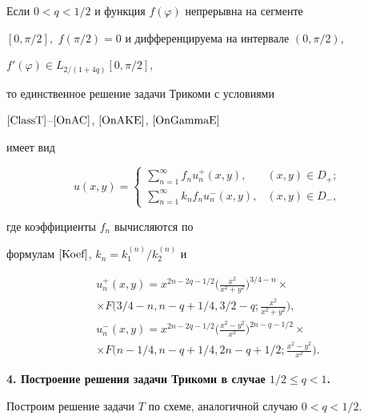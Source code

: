\begin{thm}


Если $0<q<1/2$ и функция $f(\varphi)$ непрерывна на сегменте


$[0,\pi/2],$ $f(\pi/2) = 0$ и дифференцируема на интервале $(0,\pi/2)$,


$f'(\varphi)\in L_{2/(1+4q)}[0,\pi/2]$, 


то единственное решение задачи Трикоми с условиями


$\eqref{ClassT}$--$\eqref{OnAC}$, $\eqref{OnAKE}$, $\eqref{OnGammaE}$


имеет вид


$$


u(x,y) =\begin{cases}


\sum\limits_{n=1}^\infty f_nu_n^+(x,y), & (x,y) \in D_+;\\


\sum\limits_{n=1}^\infty k_nf_nu_n^-(x,y), & (x,y) \in D_-,


\end{cases}


$$


где коэффициенты $f_n$ вычисляются по 


формулам $\eqref{Koef}$, $k_n = k^{(n)}_{1}/k^{(n)}_{2}$ и


\begin{gather*}


u^+_n(x,y)=x^{2n-2q-1/2}\bigg(\frac{x^2}{x^2+y^2}\bigg)^{3/4-n} \times\\


%


\times F\bigg(3/4-n,n-q+1/4,3/2-q;\frac{x^2}{x^2+y^2}\bigg), \\


%


u^-_n(x,y)=x^{2n-2q-1/2}\bigg(\frac{x^2-y^2}{x^2}\bigg)^{2n-q-1/2}\times \\


%


\times F\bigg({n-1/4},{n-q+1/4},{2n-q+1/2};\frac{x^2-y^2}{x^2}\bigg).


\end{gather*}


\end{thm}








{\bf 4. Построение решения задачи Трикоми в случае $1/2\leq q<1$.}


Построим решение задачи $T$ по схеме, аналогичной случаю $0<q<1/2$.


